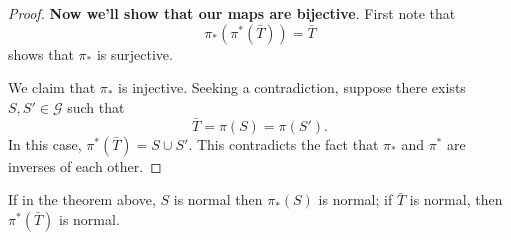 \documentclass{ximera}
\begin{document}
\begin{theorem}
\begin{proof}
    \textbf{Now we'll show that our maps are bijective}. First note
    that
    \[
    \pi_*(\pi^*(\bar{T})) = \bar{T}
    \]
    shows that $\pi_*$ is surjective.

    We claim that $\pi_*$ is injective. Seeking a contradiction,
    suppose there exists $S,S'\in \mathcal{G}$ such that
    \[
    \bar{T} = \pi(S) =\pi(S').
    \]
    In this case, $\pi^*(\bar T) = S\cup S'$. This contradicts the
    fact that $\pi_*$ and $\pi^*$ are inverses of each other.
  \end{proof}
\end{theorem}


\begin{corollary}
  If in the theorem above, $S$ is normal then $\pi_*(S)$ is normal; if
  $\bar{T}$ is normal, then $\pi^*(\bar{T})$ is normal.
\end{corollary}
\end{document}
